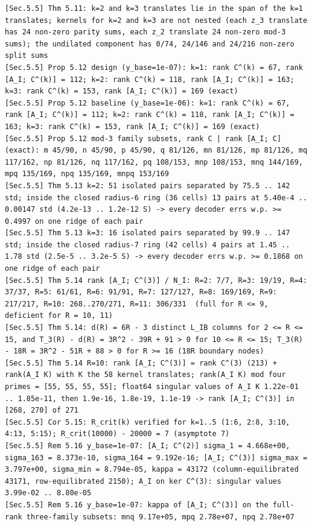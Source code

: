\documentclass[11pt,a4paper]{article}
\theoremstyle{definition}
\theoremstyle{remark}
\begin{document}
\begin{lstlisting}[style=consolestyle]
[Sec.5.5] Thm 5.11: k=2 and k=3 translates lie in the span of the k=1 translates; kernels for k=2 and k=3 are not nested (each z_3 translate has 24 non-zero parity sums, each z_2 translate 24 non-zero mod-3 sums); the undilated component has 0/74, 24/146 and 24/216 non-zero split sums
[Sec.5.5] Prop 5.12 design (y_base=1e-07): k=1: rank C^(k) = 67, rank [A_I; C^(k)] = 112; k=2: rank C^(k) = 118, rank [A_I; C^(k)] = 163; k=3: rank C^(k) = 153, rank [A_I; C^(k)] = 169 (exact)
[Sec.5.5] Prop 5.12 baseline (y_base=1e-06): k=1: rank C^(k) = 67, rank [A_I; C^(k)] = 112; k=2: rank C^(k) = 118, rank [A_I; C^(k)] = 163; k=3: rank C^(k) = 153, rank [A_I; C^(k)] = 169 (exact)
[Sec.5.5] Prop 5.12 mod-3 family subsets, rank C | rank [A_I; C] (exact): m 45/90, n 45/90, p 45/90, q 81/126, mn 81/126, mp 81/126, mq 117/162, np 81/126, nq 117/162, pq 108/153, mnp 108/153, mnq 144/169, mpq 135/169, npq 135/169, mnpq 153/169
[Sec.5.5] Thm 5.13 k=2: 51 isolated pairs separated by 75.5 .. 142 std; inside the closed radius-6 ring (36 cells) 13 pairs at 5.40e-4 .. 0.00147 std (4.2e-13 .. 1.2e-12 S) -> every decoder errs w.p. >= 0.4997 on one ridge of each pair
[Sec.5.5] Thm 5.13 k=3: 16 isolated pairs separated by 99.9 .. 147 std; inside the closed radius-7 ring (42 cells) 4 pairs at 1.45 .. 1.78 std (2.5e-5 .. 3.2e-5 S) -> every decoder errs w.p. >= 0.1868 on one ridge of each pair
[Sec.5.5] Thm 5.14 rank [A_I; C^(3)] / N_I: R=2: 7/7, R=3: 19/19, R=4: 37/37, R=5: 61/61, R=6: 91/91, R=7: 127/127, R=8: 169/169, R=9: 217/217, R=10: 268..270/271, R=11: 306/331  (full for R <= 9, deficient for R = 10, 11)
[Sec.5.5] Thm 5.14: d(R) = 6R - 3 distinct L_IB columns for 2 <= R <= 15, and T_3(R) - d(R) = 3R^2 - 39R + 91 > 0 for 10 <= R <= 15; T_3(R) - 18R = 3R^2 - 51R + 88 > 0 for R >= 16 (18R boundary nodes)
[Sec.5.5] Thm 5.14 R=10: rank [A_I; C^(3)] = rank C^(3) (213) + rank(A_I K) with K the 58 kernel translates; rank(A_I K) mod four primes = [55, 55, 55, 55]; float64 singular values of A_I K 1.22e-01 .. 1.85e-11, then 1.9e-16, 1.8e-19, 1.1e-19 -> rank [A_I; C^(3)] in [268, 270] of 271
[Sec.5.5] Cor 5.15: R_crit(k) verified for k=1..5 (1:6, 2:8, 3:10, 4:13, 5:15); R_crit(10000) - 20000 = 7 (asymptote 7)
[Sec.5.5] Rem 5.16 y_base=1e-07: [A_I; C^(2)] sigma_1 = 4.668e+00, sigma_163 = 8.373e-10, sigma_164 = 9.192e-16; [A_I; C^(3)] sigma_max = 3.797e+00, sigma_min = 8.794e-05, kappa = 43172 (column-equilibrated 43171, row-equilibrated 2150); A_I on ker C^(3): singular values 3.99e-02 .. 8.80e-05
[Sec.5.5] Rem 5.16 y_base=1e-07: kappa of [A_I; C^(3)] on the full-rank three-family subsets: mnq 9.17e+05, mpq 2.78e+07, npq 2.78e+07

\end{lstlisting}
\end{document}
